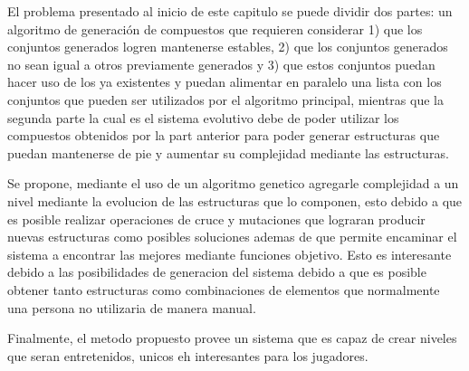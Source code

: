 El problema presentado al inicio de este capitulo se puede dividir dos partes:
un algoritmo de generación de compuestos que requieren considerar 1) que los
conjuntos generados logren mantenerse estables, 2) que los conjuntos generados
no sean igual a otros previamente generados y 3) que estos conjuntos puedan
hacer uso de los ya existentes y puedan alimentar en paralelo una lista con los
conjuntos que pueden ser utilizados por el algoritmo principal, mientras que la
segunda parte la cual es el sistema evolutivo debe de poder utilizar los
compuestos obtenidos por la part anterior para poder generar estructuras que
puedan mantenerse de pie y aumentar su complejidad mediante las estructuras.

Se propone, mediante el uso de un algoritmo genetico agregarle complejidad a un
nivel mediante la evolucion de las estructuras que lo componen, esto debido a
que es posible realizar operaciones de cruce y mutaciones que lograran producir
nuevas estructuras como posibles soluciones ademas de que permite encaminar el
sistema a encontrar las mejores mediante funciones objetivo. Esto es interesante
debido a las posibilidades de generacion del sistema debido a que es posible
obtener tanto estructuras como combinaciones de elementos que normalmente una
persona no utilizaria de manera manual.

Finalmente, el metodo propuesto provee un sistema que es capaz de crear niveles
que seran entretenidos, unicos eh interesantes para los jugadores.
 